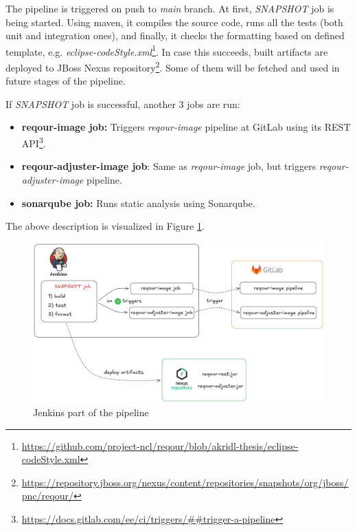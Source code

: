 \documentclass[../main.tex]{subfiles}
\begin{document}
The pipeline is triggered on push to \textit{main} branch. At first, \textit{SNAPSHOT} job is being started. Using maven, it compiles the source code, runs all the tests (both unit and integration ones), and finally, it checks the formatting based on defined template, e.g. \textit{eclipse-codeStyle.xml}\footnote{\url{https://github.com/project-ncl/reqour/blob/akridl-thesis/eclipse-codeStyle.xml}}. In case this succeeds, built artifacts are deployed to JBoss Nexus repository\footnote{\url{https://repository.jboss.org/nexus/content/repositories/snapshots/org/jboss/pnc/reqour/}}. Some of them will be fetched and used in future stages of the pipeline.

If \textit{SNAPSHOT} job is successful, another 3 jobs are run:
\begin{itemize}
    \item \textbf{reqour-image job:} Triggers \textit{reqour-image} pipeline at GitLab using its REST API\footnote{\url{https://docs.gitlab.com/ee/ci/triggers/##trigger-a-pipeline}}.

    \item \textbf{reqour-adjuster-image job}: Same as \textit{reqour-image} job, but triggers \textit{reqour-adjuster-image} pipeline.

    \item \textbf{sonarqube job:} Runs static analysis using Sonarqube.
\end{itemize}

The above description is visualized in Figure \ref{fig:jenkins}.

\begin{figure}
  \begin{center}
    \includegraphics[width=\textwidth]{images/jenkins.png}
  \end{center}
  \caption{Jenkins part of the pipeline}
  \label{fig:jenkins}
\end{figure}
\end{document}
